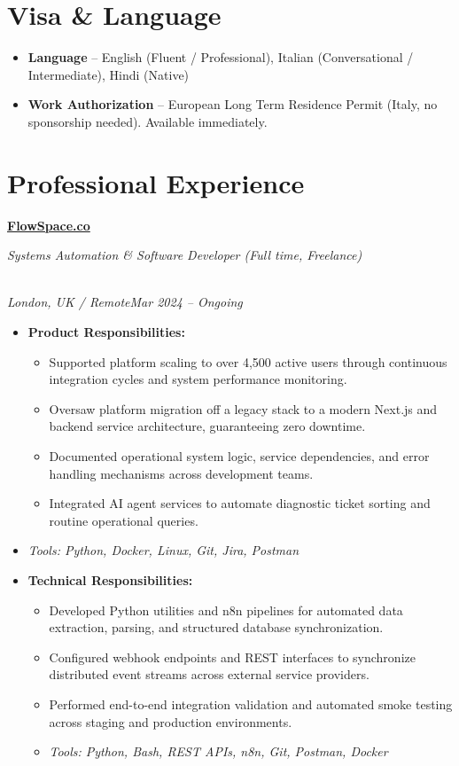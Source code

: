 \documentclass[a4paper,10pt]{article}
\newcommand{\role}[4]{\vspace{3pt}\noindent\hspace{0.6em}\parbox[t]{0.38\textwidth}{\raggedright\textbf{#1}}\hfill\parbox[t]{0.58\textwidth}{\raggedleft\textit{#2}}\\{\textit{#3}\hfill\textit{#4}}\vspace{1pt}}
\begin{document}
\section{Visa \& Language}
\begin{itemize}
\item \textbf{Language} -- English (Fluent / Professional), Italian (Conversational / Intermediate), Hindi (Native)
\item \textbf{Work Authorization} -- European Long Term Residence Permit (Italy, no sponsorship needed). Available immediately.
\end{itemize}

\section{Professional Experience}
\role{\href{https://flowspace.co}{FlowSpace.co}}{Systems Automation \& Software Developer (Full time, Freelance)}{London, UK / Remote}{Mar 2024 -- Ongoing}
\begin{itemize}
\item \textbf{Product Responsibilities:}
\begin{itemize}[label=--]
\item Supported platform scaling to over 4,500 active users through continuous integration cycles and system performance monitoring.
\item Oversaw platform migration off a legacy stack to a modern Next.js and backend service architecture, guaranteeing zero downtime.
\item Documented operational system logic, service dependencies, and error handling mechanisms across development teams.
\item Integrated AI agent services to automate diagnostic ticket sorting and routine operational queries.
\end{itemize}
\item \textit{Tools: Python, Docker, Linux, Git, Jira, Postman}
\item \textbf{Technical Responsibilities:}
\begin{itemize}[label=--]
\item Developed Python utilities and n8n pipelines for automated data extraction, parsing, and structured database synchronization.
\item Configured webhook endpoints and REST interfaces to synchronize distributed event streams across external service providers.
\item Performed end-to-end integration validation and automated smoke testing across staging and production environments.
\item \textit{Tools: Python, Bash, REST APIs, n8n, Git, Postman, Docker}
\end{itemize}
\end{itemize}
\end{document}
